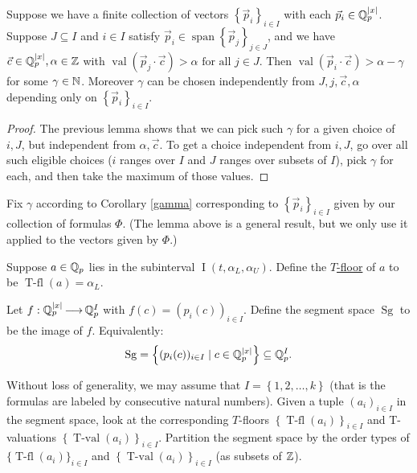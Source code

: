 \documentclass{amsart}
\newcommand{\curly}[1]{\left\{#1\right\}}
\DeclareMathOperator{\Sg}{Sg}
\DeclareMathOperator{\vecspan}{span}
\DeclareMathOperator{\val}{val}
\DeclareMathOperator{\tval}{T-val}
\DeclareMathOperator{\tfl}{T-fl}
\DeclareMathOperator{\inti}{I}
\newcommand{\defn}{\ul}
\newcommand{\interval}{\inti(t, \alpha_L, \alpha_U)}
\begin{document}
\begin{Corollary}	 \label{gamma}
  Suppose we have a finite collection of vectors $\curly{\vec p_i}_{i \in I}$ with each $\vec p_i \in \mathbb{Q}_p^{|x|}$.
  Suppose $J \subseteq I$ and $i \in I$ satisfy $\vec p_i \in \vecspan \curly{\vec p_j}_{j \in J}$,
  and we have $\vec c \in \mathbb{Q}_p^{|x|}, \alpha \in \mathbb{Z}$ with $\val(\vec p_j \cdot \vec c) > \alpha \text{ for all } j \in J$.
  Then $\val(\vec p_i \cdot \vec c) > \alpha - \gamma$
  for some $\gamma \in \mathbb{N}$.
  Moreover $\gamma$ can be chosen independently from $J, j, \vec c, \alpha$ depending only on $\curly{\vec p_i}_{i \in I}$.
\end{Corollary}
\begin{proof}
  The previous lemma shows that we can pick such $\gamma$ for a given choice of $i, J$, but independent from $\alpha, \vec c$.
  To get a choice independent from $i, J$, go over all such eligible choices 
  ($i$ ranges over $I$ and $J$ ranges over subsets of $I$),
  pick $\gamma$ for each, and then take the maximum of those values.  
\end{proof}

Fix $\gamma$ according to Corollary \ref{gamma} corresponding to $\curly{\vec p_i}_{i \in I}$ given by our collection of formulas $\Phi$.
(The lemma above is a general result, but we only use it applied to the vectors given by $\Phi$.)

\begin{Definition}
  Suppose $a \in \mathbb{Q}_p$ lies in the subinterval $\interval$.
  Define the \defn{$T$-floor} of $a$ to be $\tfl(a) = \alpha_L$.
\end{Definition}

\begin{Definition}
  Let $f: \mathbb{Q}_p^{|x|} \operatorname{\longrightarrow} \mathbb{Q}_p^I$ with $f(c) = (p_i(c))_{i \in I}$.
  Define the segment space $\Sg$ to be the image of $f$.
  Equivalently:
  \begin{align*}
    \Sg = \curly{(p_i(c))_{i \in I} \mid c \in \Q_p^{|x|}} \subseteq \Q_p^I.
  \end{align*}
\end{Definition}

Without loss of generality, we may assume that $I = \curly{1,2, \ldots, k}$ (that is the formulas are labeled by consecutive natural numbers).
Given a tuple $(a_i)_{i\in I}$ in the segment space,
look at the corresponding $T$-floors $\curly{\tfl(a_i)}_{i\in I}$ and T-valuations $\curly{\tval(a_i)}_{i\in I}$.
Partition the segment space by the order types of $\{\tfl(a_i)\}_{i\in I}$ and $\curly{\tval(a_i)}_{i\in I}$ (as subsets of $\mathbb{Z}$).
\end{document}
